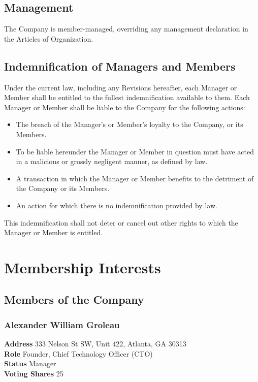 \documentclass[11pt]{article}
\begin{document}
\subsection{Management}
The Company is member-managed, overriding any management declaration in the Articles of Organization.

\subsection{Indemnification of Managers and Members}
Under the current law, including any Revisions hereafter, each Manager or Member shall be entitled to the fullest indemnification available to them. Each Manager or Member shall be liable to the Company for the following actions:\\
\begin{itemize}
\item The breach of the Manager's or Member's loyalty to the Company, or its Members.
\item To be liable hereunder the Manager or Member in question must have acted in a malicious or grossly negligent manner, as defined by law.
\item A transaction in which the Manager or Member benefits to the detriment of the Company or its Members.
\item An action for which there is no indemnification provided by law.\\
\end{itemize}
This indemnification shall not deter or cancel out other rights to which the Manager or Member is entitled.

\section{Membership Interests}

\subsection{Members of the Company}

\subsubsection{Alexander William Groleau}
\textbf{Address} 333 Nelson St SW, Unit 422, Atlanta, GA 30313\\
\textbf{Role} Founder, Chief Technology Officer (CTO)\\
\textbf{Status} Manager \\
\textbf{Voting Shares} 25
\end{document}
